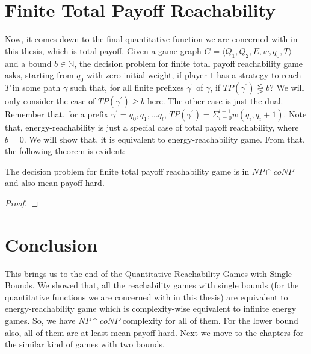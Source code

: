 \section{Finite Total Payoff Reachability}
Now, it comes down to the final quantitative function we are concerned with in this thesis, which is total payoff. Given a game graph $G=\langle Q_1, Q_2, E, w, q_0,T\rangle$ and a bound $b \in \mathbb{N}$, the decision problem for finite total payoff reachability game asks, starting from $q_0$ with zero initial weight, if player $1$ has a strategy to reach $T$ in some path $\gamma$ such that, for all finite prefixes $\gamma^{\prime}$ of $\gamma$, if $TP(\gamma^{\prime}) \lesseqgtr b$? We will only consider the case of  $TP(\gamma^{\prime}) \geq b$ here. The other case is just the dual. Remember that, for a prefix $\gamma^{\prime}= q_0,q_1,\ldots q_l$, $TP(\gamma^{\prime})= \Sigma_{i=0}^{l-1} w(q_i,q_i+1)$. Note that, energy-reachability is just a special case of total payoff reachability, where $b=0$. We will show that, it is equivalent to energy-reachability game. From that, the following theorem is evident:\\
\begin{theorem}
\label{fin-totalpayoff-thm}
The decision problem for finite total payoff reachability game is in $NP \cap coNP$ and also mean-payoff hard. 
\end{theorem}
\begin{proof}
\huge{}
\end{proof}

\section{Conclusion}
This brings us to the end of the Quantitative Reachability Games with Single Bounds. We showed that, all the reachability games with single bounds (for the quantitative functions we are concerned with in this thesis) are equivalent to energy-reachability game which is complexity-wise equivalent to infinite energy games. So, we have $NP \cap coNP$ complexity for all of them. For the lower bound also, all of them are at least mean-payoff hard. Next we move to the chapters for the similar kind of games with two bounds. 
